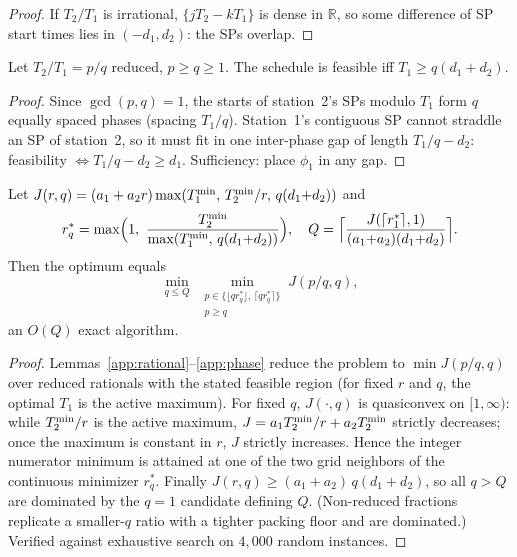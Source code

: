 \begin{proof}
If $T_2/T_1$ is irrational, $\{ j T_2 - k T_1 \}$ is dense in
$\mathbb{R}$, so some difference of SP start times lies in
$(-d_1, d_2)$: the SPs overlap.
\end{proof}

\begin{lemma}
\label{app:phase}
Let $T_2/T_1 = p/q$ reduced, $p \ge q \ge 1$. The schedule is feasible iff
$T_1 \ge q (d_1 + d_2)$.
\end{lemma}

\begin{proof}
Since $\gcd(p,q) = 1$, the starts of station~2's SPs modulo $T_1$ form $q$
equally spaced phases (spacing $T_1/q$). Station~1's contiguous SP cannot
straddle an SP of station~2, so it must fit in one inter-phase gap of
length $T_1/q - d_2$: feasibility $\iff T_1/q - d_2 \ge d_1$. Sufficiency:
place $\phi_1$ in any gap.
\end{proof}

\begin{theorem}[exact $N{=}2$]
\label{app:n2}
Let $J(r, q) = (a_1 + a_2 r)\max(T^{\min}_1,\, T^{\min}_2/r,\, q(d_1{+}d_2))$ and
\begin{equation*}
r_q^* = \max\!\Big(1,\ \frac{T^{\min}_2}{\max(T^{\min}_1,\, q(d_1{+}d_2))}\Big),
\quad
Q = \Big\lceil \frac{J(\lceil r_1^* \rceil, 1)}{(a_1{+}a_2)(d_1{+}d_2)} \Big\rceil.
\end{equation*}
Then the optimum equals
\begin{equation*}
\min_{q \le Q}\ \min_{\substack{p \in \{\lfloor q r_q^* \rfloor,\,
\lceil q r_q^* \rceil\}\\ p \ge q}} J(p/q, q),
\end{equation*}
an $O(Q)$ exact algorithm.
\end{theorem}

\begin{proof}
Lemmas~\ref{app:rational}--\ref{app:phase} reduce the problem to
$\min J(p/q, q)$ over reduced rationals with the stated feasible region
(for fixed $r$ and $q$, the optimal $T_1$ is the active maximum). For
fixed $q$, $J(\cdot, q)$ is quasiconvex on $[1, \infty)$: while
$T^{\min}_2/r$ is the active maximum, $J = a_1 T^{\min}_2/r + a_2 T^{\min}_2$
strictly decreases; once the maximum is constant in $r$, $J$ strictly
increases. Hence the integer numerator minimum is attained at one of the
two grid neighbors of the continuous minimizer $r_q^*$. Finally
$J(r, q) \ge (a_1 + a_2)\, q (d_1 + d_2)$, so all
$q > Q$ are dominated by the $q = 1$ candidate defining $Q$.
(Non-reduced fractions replicate a smaller-$q$ ratio with a tighter
packing floor and are dominated.) Verified against exhaustive search on
$4{,}000$ random instances.
\end{proof}

